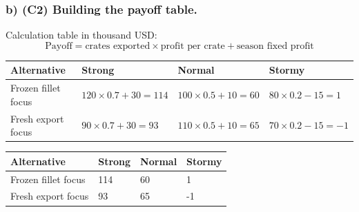 	
	\subsubsection*{b) \textbf{(C2)} Building the payoff table.}
	\label{subsec:problem14-seafood-export-licenses-c2}
	Calculation table in thousand USD:
	\[
	\text{Payoff}=\text{crates exported}\times\text{profit per crate}+\text{season fixed profit}
	\]
	\begin{center}
		\begin{tabular}{llll}
			\toprule
			Alternative & Strong & Normal & Stormy \\
			\midrule
			Frozen fillet focus & $120 \times 0.7 + 30 = 114$ & $100 \times 0.5 + 10 = 60$ & $80 \times 0.2 - 15 = 1$ \\
			Fresh export focus & $90 \times 0.7 + 30 = 93$ & $110 \times 0.5 + 10 = 65$ & $70 \times 0.2 - 15 = -1$ \\
			\bottomrule
		\end{tabular}
	\end{center}
	
	\begin{center}
		\begin{tabular}{llll}
			\toprule
			Alternative & Strong & Normal & Stormy \\
			\midrule
			Frozen fillet focus & 114 & 60 & 1 \\
			Fresh export focus & 93 & 65 & -1 \\
			\bottomrule
		\end{tabular}
	\end{center}
	
	


